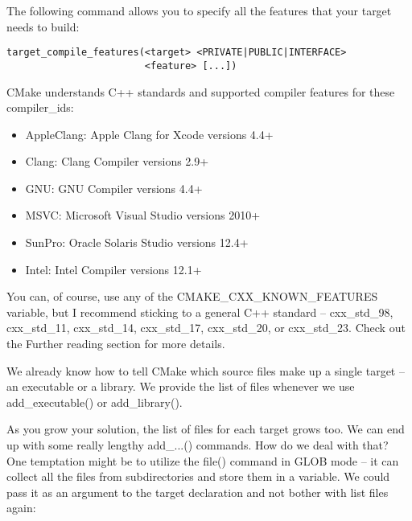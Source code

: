 The following command allows you to specify all the features that your target needs to build:

\begin{lstlisting}[style=styleCMake]
target_compile_features(<target> <PRIVATE|PUBLIC|INTERFACE>
						<feature> [...])
\end{lstlisting}

CMake understands C++ standards and supported compiler features for these compiler\_ids:

\begin{itemize}
\item 
AppleClang: Apple Clang for Xcode versions 4.4+

\item 
Clang: Clang Compiler versions 2.9+

\item 
GNU: GNU Compiler versions 4.4+

\item 
MSVC: Microsoft Visual Studio versions 2010+

\item 
SunPro: Oracle Solaris Studio versions 12.4+

\item 
Intel: Intel Compiler versions 12.1+
\end{itemize}

\begin{tcolorbox}[colback=blue!5!white,colframe=blue!75!black,title=Important Note]
You can, of course, use any of the CMAKE\_CXX\_KNOWN\_FEATURES variable, but I recommend sticking to a general C++ standard – cxx\_std\_98, cxx\_std\_11, cxx\_std\_14, cxx\_std\_17, cxx\_std\_20, or cxx\_std\_23. Check out the Further reading section for more details.
\end{tcolorbox}


We already know how to tell CMake which source files make up a single target – an executable or a library. We provide the list of files whenever we use add\_executable() or add\_library().

As you grow your solution, the list of files for each target grows too. We can end up with some really lengthy add\_...() commands. How do we deal with that? One temptation might be to utilize the file() command in GLOB mode – it can collect all the files from subdirectories and store them in a variable. We could pass it as an argument to the target declaration and not bother with list files again:

